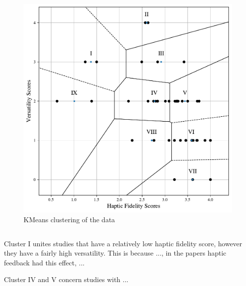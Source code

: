 \begin{figure}[htbp]
    \centering
    \includegraphics[width=\columnwidth]{figures/literature_data.pdf} 
    \caption{KMeans clustering of the data}
    \label{fig:kmeans}
\end{figure}


\subsection{}
Cluster I unites studies that have a relatively low haptic fidelity score, however they have a fairly high versatility. This is because ..., in the papers haptic feedback had this effect, ...

Cluster IV and V concern studies with ...



